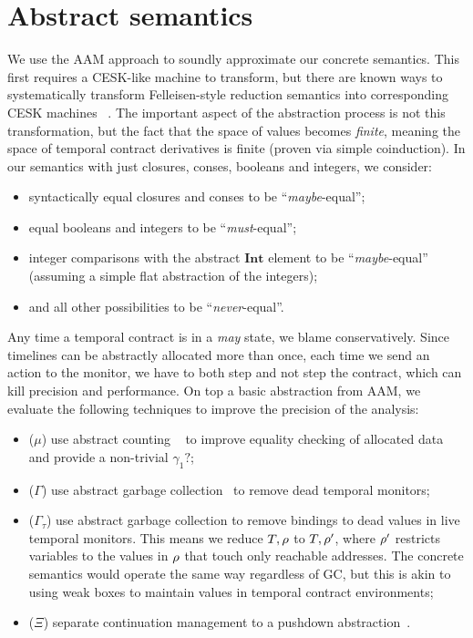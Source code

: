 

\section{Abstract semantics}

We use the AAM approach to soundly approximate our concrete semantics.
%
This first requires a CESK-like machine to transform, but there are known ways to systematically transform Felleisen-style reduction semantics into corresponding CESK machines ~\citep{dvanhorn:Danvy-Nielsen:RS-04-26}.
%
The important aspect of the abstraction process is not this transformation, but the fact that the space of values becomes \emph{finite}, meaning the space of temporal contract derivatives is finite (proven via simple coinduction).
%
In our semantics with just closures, conses, booleans and integers, we consider:
\begin{itemize}
 \item syntactically equal closures and conses to be ``\emph{maybe}-equal'';
 \item equal booleans and integers to be ``\emph{must}-equal'';
 \item integer comparisons with the abstract $\mathbf{Int}$ element to be ``\emph{maybe}-equal'' (assuming a simple flat abstraction of the integers);
 \item and all other possibilities to be ``\emph{never}-equal''.
\end{itemize}
%
Any time a temporal contract is in a \emph{may} state, we blame conservatively.
%
Since timelines can be abstractly allocated more than once, each time we send an action to the monitor, we have to both step and not step the contract, which can kill precision and performance.
%
On top a basic abstraction from AAM, we evaluate the following techniques to improve the precision of the analysis:
\begin{itemize}
\item{($\mu$) use abstract counting ~\citep{dvanhorn:Might:2006:GammaCFA} to improve equality checking of allocated data and provide a non-trivial $\gamma_1?$;}
\item{($\Gamma$) use abstract garbage collection~\citep{dvanhorn:Might:2006:GammaCFA} to remove dead temporal monitors;}
\item{($\Gamma_\tau$) use abstract garbage collection to remove bindings to dead values in live temporal monitors.
%
This means we reduce $T,\rho$ to $T,\rho'$, where $\rho'$ restricts variables to the values in $\rho$ that touch only reachable addresses.
%
The concrete semantics would operate the same way regardless of GC, but this is akin to using weak boxes to maintain values in temporal contract environments;}
\item{($\Xi$) separate continuation management to a pushdown abstraction~\citep{dvanhorn:Vardoulakis2011CFA2}.}%
\end{itemize}

